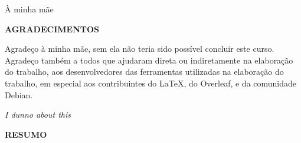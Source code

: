 \documentclass[../main.tex]{subfiles}
\begin{document}
\vspace*{\fill}

\begin{dedicatoria}
   \vspace*{10 cm}
   \begin{flushright}
   \begin{minipage}[t]{7cm}
     À minha mãe
   \end{minipage}
   \end{flushright}
\end{dedicatoria}


\begin{center}
	\textbf{AGRADECIMENTOS}
\end{center}

Agradeço à minha mãe, sem ela não teria sido possível concluir este curso. Agradeço também a todos que ajudaram direta ou indiretamente na elaboração do trabalho, aos desenvolvedores das ferramentas utilizadas na elaboração do trabalho, em especial aos contribuintes do \LaTeX, do Overleaf, e da comunidade Debian.

\newpage


\vspace*{\fill}

\begin{epigrafe}
    \vspace*{10cm}
	\begin{flushright}
	  \begin{minipage}[t]{7cm}
		\textit{I dunno about this}
	 \end{minipage}
	\end{flushright}
\end{epigrafe}


\begin{center}
	\textbf{RESUMO}
\end{center}



  \vspace{\onelineskip}
\end{document}
